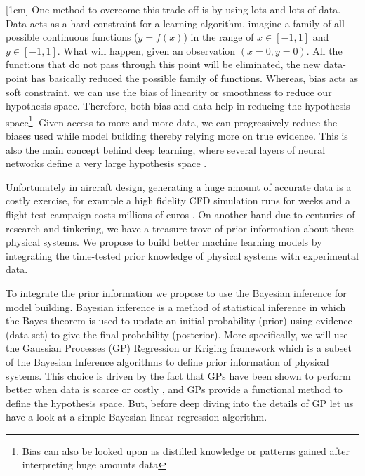 [1cm]
One method to overcome this trade-off is by using lots and lots of data. Data acts as a hard constraint for a learning algorithm, imagine a family of all possible continuous functions ($y = f(x)$) in the range of $x \in [-1, 1]$ and $y \in [-1, 1]$. What will happen, given an observation $(x = 0, y = 0)$. All the functions that do not pass through this point will be eliminated, the new data-point has basically reduced the possible family of functions. Whereas, bias acts as soft constraint, we can use the bias of linearity or smoothness to reduce our hypothesis space. Therefore, both bias and data help in reducing the hypothesis space\footnote{Bias can also be looked upon as distilled knowledge or patterns gained after interpreting huge amounts data}. Given access to more and more data, we can progressively reduce the biases used while model building thereby relying more on true evidence. This is also the main concept behind deep learning, where several layers of neural networks define a very large hypothesis space \cite{Goodfellow-et-al-2016, lecun2015deep}. 

Unfortunately in aircraft design, generating a huge amount of accurate data is a costly exercise, for example a high fidelity CFD simulation runs for weeks \cite{murthy2014computational, jameson2012computational, forrester2008engineering} and a flight-test campaign costs millions of euros \cite{fox2004test}. On another hand due to centuries of research and tinkering, we have a treasure trove of prior information about these physical systems. We propose to build better machine learning models by integrating the time-tested prior knowledge of physical systems with experimental data. 

To integrate the prior information we propose to use the Bayesian inference for model building. Bayesian inference is a method of statistical inference in which the Bayes theorem is used to update an initial probability (prior) using evidence (data-set) to give the final probability (posterior). More specifically, we will use the Gaussian Processes (GP) Regression or Kriging framework which is a subset of the Bayesian Inference algorithms to define prior information of physical systems. This choice is driven by the fact that GPs have been shown to perform better when data is scarce or costly \cite{Stein1999Springer}, and GPs provide a functional method to define the hypothesis space. But, before deep diving into the details of GP let us have a look at a simple Bayesian linear regression algorithm.

